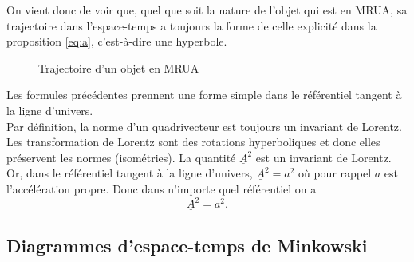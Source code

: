 \documentclass[a4paper,11pt]{report}
\theoremstyle{definition}
\theoremstyle{plain}
\theoremstyle{definition}
\theoremstyle{remark}
\newcommand{\x}{\times}
\begin{document}
            On vient donc de voir que, quel que soit la nature de l'objet qui est en MRUA, sa trajectoire dans l'espace-temps a toujours la forme de celle explicité dans la proposition \ref{eq:a}, c'est-à-dire une hyperbole.
            
            \begin{figure}[H]
            \centering
            \caption{Trajectoire d'un objet en MRUA}
            \label{fig:my_label}
            \end{figure}
            
            Les formules précédentes prennent une forme simple dans le référentiel tangent à la ligne d'univers.\\
            
            Par définition, la norme d'un quadrivecteur est toujours un invariant de Lorentz. Les transformation de Lorentz sont des rotations hyperboliques et donc elles préservent les normes (isométries). La quantité $\underline{A}^2$ est un invariant de Lorentz. Or, dans le référentiel tangent à la ligne d'univers, $\underline{A}^2 = a^2$ où pour rappel $a$ est l'accélération propre. Donc dans n'importe quel référentiel on a
            \begin{equation}
                \underline{A}^2 = a^2.
            \end{equation}
        
        \subsection{Diagrammes d'espace-temps de Minkowski}
        
\end{document}
